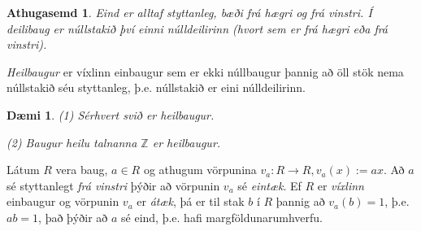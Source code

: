 \documentclass[a4paper,icelandic,11pt]{book}
\theoremstyle{plain}
\newtheorem{daemi}{Dæmi}[chapter]
\newtheorem*{ath}{Athugasemd}
\newcommand{\Z}{\mathbb{Z}}
\begin{document}
\begin{ath} 
  \emph{Eind} er alltaf styttanleg, bæði frá hægri og frá vinstri. Í deilibaug
  er núllstakið því einni núlldeilirinn (hvort sem er frá hægri eða frá
  vinstri).
\end{ath}
\begin{skilgr}
  \emph{Heilbaugur} er víxlinn
  einbaugur sem er ekki núllbaugur þannig að öll stök nema núllstakið séu
  styttanleg, þ.e. núllstakið er eini núlldeilirinn.
\end{skilgr}
\begin{daemi}
  (1) Sérhvert svið er heilbaugur.
  
  (2) Baugur heilu talnanna $\Z$ er heilbaugur.
\end{daemi}
Látum $R$ vera baug, $a\in R$ og athugum vörpunina $v_a:R\to R, v_a(x):=ax$.
Að $a$ sé styttanlegt \emph{frá vinstri} þýðir að vörpunin $v_a$ sé
\emph{eintæk}. Ef $R$ er \emph{víxlinn} einbaugur og vörpunin $v_a$ er
\emph{átæk}, þá er til stak $b$ í $R$ þannig að $v_a(b) = 1$, þ.e. $ab = 1$,
það þýðir að $a$ sé eind, þ.e. hafi margföldunarumhverfu.
\end{document}
